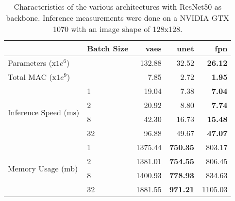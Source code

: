 \begin{table}[ht]
\centering
\caption{Characteristics of the various architectures with ResNet50 as backbone. Inference measurements were done on a NVIDIA GTX 1070 with an image shape of 128x128.}
\label{tab:model_characteristics}
\begin{tabular}{llrrr}
\toprule
 & Batch Size & vaes & unet & fpn \\
\midrule
Parameters (x$1e^6$) &   & 132.88 & 32.52 & \textbf{26.12} \\
Total MAC (x$1e^9$) &   & 7.85 & 2.72 & \textbf{1.95} \\
\multirow[c]{4}{*}{Inference Speed (ms)} & 1 & 19.04 & 7.38 & \textbf{7.04} \\
 & 2 & 20.92 & 8.80 & \textbf{7.74} \\
 & 8 & 42.30 & 16.73 & \textbf{15.48} \\
 & 32 & 96.88 & 49.67 & \textbf{47.07} \\
\multirow[c]{4}{*}{Memory Usage (mb)} & 1 & 1375.44 & \textbf{750.35} & 803.17 \\
 & 2 & 1381.01 & \textbf{754.55} & 806.45 \\
 & 8 & 1400.93 & \textbf{778.93} & 834.63 \\
 & 32 & 1881.55 & \textbf{971.21} & 1105.03 \\
\bottomrule
\end{tabular}
\end{table}
